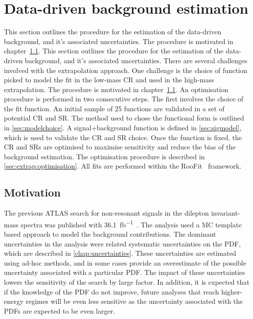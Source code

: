 \chapter{Data-driven background estimation}\label{chap:bkgmodel}
This section outlines the procedure for the estimation of the data-driven background, and it's associated uncertainties. The procedure is motivated in chapter~\cref{sec:bkgmodel:motivation}. 
This section outlines the procedure for the estimation of the data-driven background, and it's associated uncertainties. There are several challenges involved with the extrapolation approach. One challenge is the choice of function picked to model the fit in the low-mass CR and used in the high-mass extrapolation. The procedure is motivated in chapter~\cref{sec:bkgmodel:motivation}. An optimisation procedure is performed in two consecutive steps. The first involves the choice of the fit function. An initial sample of 25 functions are validated in a set of potential CR and SR. The method used to chose the functional form is outlined in \cref{sec:modelchoice}. A signal+background function is defined in \cref{sec:sigmodel}, which is used to validate the CR and SR choice. Once the function is fixed, the CR and SRs are optimised to maximise sensitivity and reduce the bias of the background estimation. The optimisation procedure is described in \cref{sec:extrap:optimisation}. All fits are performed within the RooFit~\cite{RooFit} framework.

\section{Motivation}\label{sec:bkgmodel:motivation}
The previous ATLAS search for non-resonant signals in the dilepton invariant-mass spectra was published with \SI{36.1}{\femto\barn^{-1}}~\cite{EXOT-2016-05}. The analysis used a MC template based approach to model the background contributions. The dominant uncertainties in the analysis were related systematic uncertainties on the PDF, which are described in \cref{chap:uncertainties}. These uncertainties are estimated using ad-hoc methods, and in some cases provide an overestimate of the possible uncertainty associated with a particular PDF. The impact of these uncertainties lowers the sensitivity of the search by large factor. In addition, it is expected that if the knowledge of the PDF do not improve, future analyses that reach higher-energy regimes will be even less sensitive as the uncertainty associated with the PDFs are expected to be even larger. 

